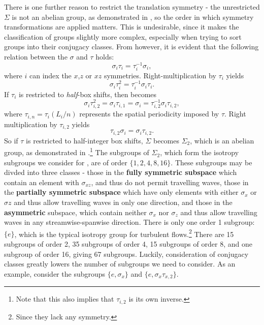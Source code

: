 There is one further reason to restrict the translation symmetry - the unrestricted $\Sigma$ is not an abelian group, as demonstrated in , so the order in which symmetry transformations are applied matters. This is undesirable, since it makes the classification of groups slightly more complex, especially when trying to sort groups into their conjugacy classes. From  however, it is evident that the following relation between the $\sigma$ and $\tau$ holds:
\begin{equation}
\sigma_{i}\tau_{i} = \tau_i^{-1}\sigma_i,
\end{equation}
where $i$ can index the $x$,$z$ or $xz$ symmetries. Right-multiplication by $\tau_i$ yields
\begin{equation}\label{eq:pscom}
\sigma_i\tau_i^2 = \tau_i^{-1}\sigma_i\tau_i.
\end{equation}
If $\tau_i$ is restricted to \emph{half}-box shifts, then  becomes
\begin{equation}
\sigma_i\tau_{i,2}^2 = \sigma_i\tau_{i,1} = \sigma_i = \tau_{i,2}^{-1}\sigma_{i}\tau_{i,2},
\end{equation}
where $\tau_{i,n} = \tau_i(L_i/n)$ represents the spatial periodicity imposed by $\tau$. Right multiplication by $\tau_{i,2}$ yields
\begin{equation}
\tau_{i,2}\sigma_{i} = \sigma_{i}\tau_{i,2}.
\end{equation}
So if $\tau$ is restricted to half-integer box shifts, $\Sigma$ becomes $\Sigma_2$, which is an abelian group, as demonstrated in .\footnote{Note that this also implies that $\tau_{i,2}$ is its own inverse.} The subgroups of $\Sigma_2$, which form the isotropy subgroups we consider for \pCf, are of order $\{1,2,4,8,16\}$. These subgroups may be divded into three classes - those in the {\bf fully symmetric subspace} which contain an element with $\sigma_{xz}$, and thus do not permit travelling waves, those in the {\bf partially symmetric subspace} which have only elements with either $\sigma_{x}$ or $\sigma{z}$ and thus allow travelling waves in only one direction, and those in the {\bf asymmetric} subspace, which contain neither $\sigma_x$ nor $\sigma_z$ and thus allow travelling waves in any streamwise-spanwise direction. There is only one order 1 subgroup: $\{ e \}$, which is the typical isotropy group for turbulent flows.\footnote{Since they lack any symmetry.} There are 15 subgroups of order 2, 35 subgroups of order 4, 15 subgroups of order 8, and one subgroup of order 16, giving 67 subgroups. Luckily, consideration of conjugacy classes greatly lowers the number of subgroups we need to consider. As an example, consider the subgroups $\{ e, \sigma_x\}$ and $\{e, \sigma_x\tau_{x,2}\}$.
